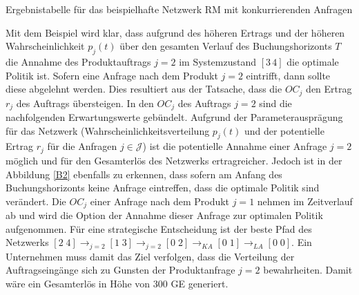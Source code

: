 \begin{table}
\begin{footnotesize}
    \caption{Ergebnistabelle für das beispielhafte Netzwerk RM mit konkurrierenden Anfragen} \label{Tab2}
          \begin{center}
    \vspace*{3mm}
            \end{center}
\end{footnotesize}
\end{table}

Mit dem Beispiel wird klar, dass aufgrund des höheren Ertrags und der höheren Wahrscheinlichkeit $p_j(t)$ über den gesamten Verlauf des Buchungshorizonts $T$ die Annahme des Produktauftrags $j=2$ im Systemzustand $[3\,4]$ die optimale Politik ist. Sofern eine Anfrage nach dem Produkt $j=2$ eintrifft, dann sollte diese abgelehnt werden. Dies resultiert aus der Tatsache, dass die $OC_j$ den Ertrag $r_j$ des Auftrags übersteigen. In den $OC_j$ des Auftrags $j=2$ sind die nachfolgenden Erwartungswerte gebündelt. Aufgrund der Parameterausprägung für das Netzwerk (Wahrscheinlichkeitsverteilung $p_j(t)$ und der potentielle Ertrag $r_j$ für die Anfragen $j\in\mathcal{J}$) ist die potentielle Annahme einer Anfrage $j=2$ möglich und für den Gesamterlös des Netzwerks ertragreicher. Jedoch ist in der Abbildung \ref{B2} ebenfalls zu erkennen, dass sofern am Anfang des Buchungshorizonts keine Anfrage eintreffen, dass die optimale Politik sind verändert. Die $OC_j$ einer Anfrage nach dem Produkt $j=1$ nehmen im Zeitverlauf ab und wird die Option der Annahme dieser Anfrage zur optimalen Politik aufgenommen. Für eine strategische Entscheidung ist der beste Pfad des Netzwerks $[2\;4] \rightarrow_{j=2} [1\;3] \rightarrow_{j=2} [0\;2] \rightarrow_{KA} [0\;1]\rightarrow_{LA} [0\;0]$. Ein Unternehmen muss damit das Ziel verfolgen, dass die Verteilung der Auftragseingänge sich zu Gunsten der Produktanfrage $j=2$ bewahrheiten. Damit wäre ein Gesamterlös in Höhe von $300$ GE generiert. 